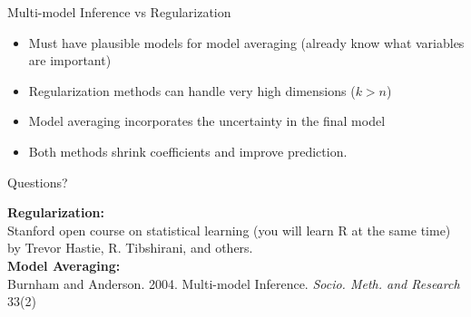 \documentclass{beamer}\usepackage[]{graphicx}\usepackage[]{color}
\begin{document}
\begin{frame}{Multi-model Inference vs Regularization}
\begin{itemize}
\item Must have plausible models for model averaging (already know what variables are important)
\bigskip
\item Regularization methods can handle very high dimensions ($k>n$)
\bigskip
\item Model averaging incorporates the uncertainty in the final model
\bigskip
\item Both methods shrink coefficients and improve prediction.
\end{itemize}
\end{frame}

\begin{frame}{Questions?}

\textbf{Regularization:}\\
Stanford open course on statistical learning (you will learn R at the same time) by Trevor Hastie, R. Tibshirani, and others.\\
\bigskip
\textbf{Model Averaging:}\\
Burnham and Anderson. 2004. Multi-model Inference. \emph{Socio. Meth. and Research} 33(2)\\
\end{frame}
\end{document}
